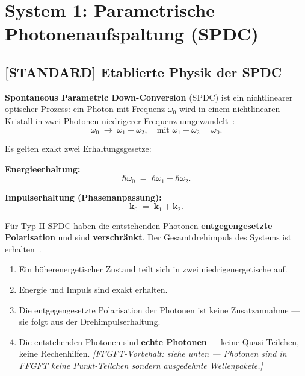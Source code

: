 \section{System 1: Parametrische Photonenaufspaltung (SPDC)}
\label{sec:spdc}

\subsection{[STANDARD] Etablierte Physik der SPDC}

\textbf{Spontaneous Parametric Down-Conversion} (SPDC) ist ein
nichtlinearer optischer Prozess: ein Photon mit Frequenz $\omega_0$
wird in einem nichtlinearen Kristall in zwei Photonen
niedrigerer Frequenz umgewandelt~\cite{Burnham1970}:
\begin{equation}
  \omega_0 \;\longrightarrow\; \omega_1 + \omega_2,
  \quad \text{mit } \omega_1 + \omega_2 = \omega_0.
\end{equation}

Es gelten exakt zwei Erhaltungsgesetze:

\textbf{Energieerhaltung:}
\begin{equation}
  \hbar\omega_0 \;=\; \hbar\omega_1 + \hbar\omega_2.
\end{equation}

\textbf{Impulserhaltung (Phasenanpassung):}
\begin{equation}
  \mathbf{k}_0 \;=\; \mathbf{k}_1 + \mathbf{k}_2.
\end{equation}

Für Typ-II-SPDC haben die entstehenden Photonen
\textbf{entgegengesetzte Polarisation} und sind \textbf{verschränkt}.
Der Gesamtdrehimpuls des Systems ist erhalten~\cite{Kwiat1995}.

\begin{keyresult}
\begin{enumerate}
  \item Ein höherenergetischer Zustand teilt sich in zwei
    niedrigenergetische auf.
  \item Energie und Impuls sind exakt erhalten.
  \item Die entgegengesetzte Polarisation der Photonen
    ist keine Zusatzannahme --- sie folgt aus der
    Drehimpulserhaltung.
  \item Die entstehenden Photonen sind \textbf{echte Photonen}
    --- keine Quasi-Teilchen, keine Rechenhilfen.
    \emph{[FFGFT-Vorbehalt: siehe unten --- Photonen sind in FFGFT
    keine Punkt-Teilchen sondern ausgedehnte Wellenpakete.]}
\end{enumerate}
\end{keyresult}

